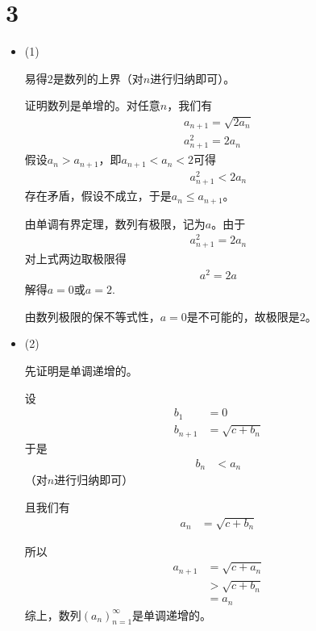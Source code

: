 \documentclass{article}
\begin{document}
\section*{3}

\begin{itemize}
  \item (1)

        易得$2$是数列的上界（对$n$进行归纳即可）。

        证明数列是单增的。对任意$n$，我们有
        \begin{align*}
          a_{n + 1} = \sqrt{2 a_n} \\
          a_{n + 1}^2 = 2 a_n
        \end{align*}
        假设$a_n > a_{n + 1}$，即$a_{n + 1} < a_n < 2$可得
        \begin{align*}
          a_{n + 1}^2 < 2 a_n
        \end{align*}
        存在矛盾，假设不成立，于是$a_n \leq a_{n + 1}$。

        由单调有界定理，数列有极限，记为$a$。由于
        \begin{align*}
          a_{n + 1}^2 = 2 a_n
        \end{align*}
        对上式两边取极限得
        \begin{align*}
          a^2 = 2 a
        \end{align*}
        解得$a = 0$或$a = 2$.

        由数列极限的保不等式性，$a = 0$是不可能的，故极限是$2$。

  \item (2)

        先证明是单调递增的。

        设
        \begin{align*}
          b_1       & = 0              \\
          b_{n + 1} & = \sqrt{c + b_n}
        \end{align*}
        于是
        \begin{align*}
          b_{n} & < a_n
        \end{align*}
        （对$n$进行归纳即可）

        且我们有
        \begin{align*}
          a_n & = \sqrt{c + b_n}
        \end{align*}

        所以
        \begin{align*}
          a_{n + 1} & = \sqrt{c + a_n} \\
                    & > \sqrt{c + b_n} \\
                    & = a_n
        \end{align*}
        综上，数列$(a_n)_{n = 1}^\infty$是单调递增的。


\end{itemize}
\end{document}
